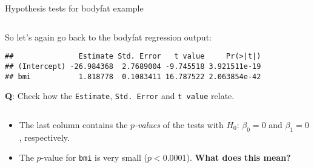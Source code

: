 \documentclass[10pt,ignorenonframetext,]{beamer}
\newenvironment{Shaded}{\begin{snugshade}}{\end{snugshade}}
\newcommand{\KeywordTok}[1]{\textcolor[rgb]{0.13,0.29,0.53}{\textbf{#1}}}
\newcommand{\NormalTok}[1]{#1}
\newcommand{\OperatorTok}[1]{\textcolor[rgb]{0.81,0.36,0.00}{\textbf{#1}}}
\begin{document}
\begin{frame}[fragile]

\begin{block}{Hypothesis tests for bodyfat example}

\(~\)

So let's again go back to the bodyfat regression output:

\vspace{2mm}

\scriptsize

\begin{Shaded}
\end{Shaded}

\begin{verbatim}
##               Estimate Std. Error   t value     Pr(>|t|)
## (Intercept) -26.984368  2.7689004 -9.745518 3.921511e-19
## bmi           1.818778  0.1083411 16.787522 2.063854e-42
\end{verbatim}

\vspace{2mm}

\normalsize

\textbf{Q}: Check how the \texttt{Estimate}, \texttt{Std.\ Error} and
\texttt{t\ value} relate.

\(~\)

\begin{itemize}
\item
  The last column contains the \emph{\(p\)-values} of the tests with
  \(H_0\): \(\beta_0=0\) and \(\beta_1=0\), respectively.
\item
  The \(p\)-value for \texttt{bmi} is very small (\(p<0.0001\)).
  \textbf{What does this mean?}
\end{itemize}

\end{block}

\end{frame}
\end{document}
